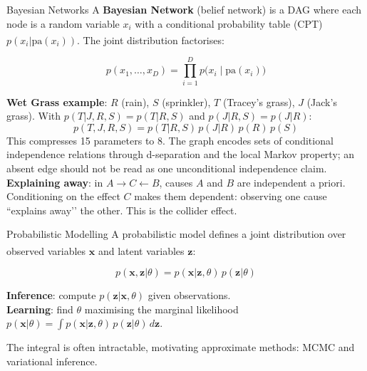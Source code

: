 \begin{v3topic}{Bayesian Networks}
    A \textbf{Bayesian Network} (belief network) is a DAG where each node is
    a random variable $x_i$ with a conditional probability table (CPT)
    $p(x_i | \mathrm{pa}(x_i))$. The joint distribution
    factorises:\textsuperscript{\cite[][pp.~33--40]{barberBayesianReasoningMachine2012}}

    \begin{equation}
        p(x_1, \ldots, x_D) = \prod_{i=1}^{D} p\bigl(x_i \mid \mathrm{pa}(x_i)\bigr)
    \end{equation}

    \textbf{Wet Grass example}: $R$ (rain), $S$ (sprinkler), $T$ (Tracey’s
    grass), $J$ (Jack’s grass). With $p(T|J,R,S)=p(T|R,S)$ and $p(J|R,S)=p(J|R)$:
    \[p(T,J,R,S) = p(T|R,S)\,p(J|R)\,p(R)\,p(S)\]
    This compresses 15 parameters to 8. The graph encodes sets of conditional
    independence relations through d-separation and the local Markov property;
    an absent edge should not be read as one unconditional independence claim.
\visualseparator
    \textbf{Explaining away}: in $A \to C \leftarrow B$, causes $A$ and $B$
    are independent a priori. Conditioning on the effect $C$ makes them
    dependent: observing one cause ``explains away’’ the other.
    This is the collider effect.

\end{v3topic}
\begin{v3topic}{Probabilistic Modelling}
    A probabilistic model defines a joint distribution over observed variables
    $\mathbf{x}$ and latent variables
    $\mathbf{z}$:\textsuperscript{\cite[][Ch.~1]{barberBayesianReasoningMachine2012}}

    \begin{equation}
        p(\mathbf{x}, \mathbf{z} | \theta) =
            p(\mathbf{x} | \mathbf{z}, \theta)\,p(\mathbf{z}|\theta)
    \end{equation}

    \textbf{Inference}: compute $p(\mathbf{z}|\mathbf{x},\theta)$ given observations.\\
    \textbf{Learning}: find $\theta$ maximising the marginal likelihood
    $p(\mathbf{x}|\theta) = \int p(\mathbf{x}|\mathbf{z},\theta)\,p(\mathbf{z}|\theta)\,d\mathbf{z}$.

    The integral is often intractable, motivating approximate methods:
    MCMC and variational inference.

\end{v3topic}
